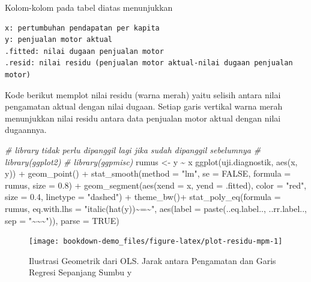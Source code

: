 \documentclass[
]{book}
\newenvironment{Shaded}{\begin{snugshade}}{\end{snugshade}}
\newcommand{\AttributeTok}[1]{\textcolor[rgb]{0.77,0.63,0.00}{#1}}
\newcommand{\CommentTok}[1]{\textcolor[rgb]{0.56,0.35,0.01}{\textit{#1}}}
\newcommand{\ConstantTok}[1]{\textcolor[rgb]{0.00,0.00,0.00}{#1}}
\newcommand{\FloatTok}[1]{\textcolor[rgb]{0.00,0.00,0.81}{#1}}
\newcommand{\FunctionTok}[1]{\textcolor[rgb]{0.00,0.00,0.00}{#1}}
\newcommand{\NormalTok}[1]{#1}
\newcommand{\OtherTok}[1]{\textcolor[rgb]{0.56,0.35,0.01}{#1}}
\newcommand{\SpecialCharTok}[1]{\textcolor[rgb]{0.00,0.00,0.00}{#1}}
\newcommand{\StringTok}[1]{\textcolor[rgb]{0.31,0.60,0.02}{#1}}
\begin{document}
Kolom-kolom pada tabel diatas menunjukkan

\begin{verbatim}
x: pertumbuhan pendapatan per kapita
y: penjualan motor aktual
.fitted: nilai dugaan penjualan motor
.resid: nilai residu (penjualan motor aktual-nilai dugaan penjualan motor)
\end{verbatim}

Kode berikut memplot nilai residu (warna merah) yaitu selisih antara nilai pengamatan aktual dengan nilai dugaan. Setiap garis vertikal warna merah menunjukkan nilai residu antara data penjualan motor aktual dengan nilai dugaannya.

\begin{Shaded}
\begin{Highlighting}[]
\CommentTok{\# library tidak perlu dipanggil lagi jika sudah dipanggil sebelumnya}
\CommentTok{\# library(ggplot2) }
\CommentTok{\# library(ggpmisc)}
\NormalTok{rumus }\OtherTok{\textless{}{-}}\NormalTok{ y }\SpecialCharTok{\textasciitilde{}}\NormalTok{ x}
\FunctionTok{ggplot}\NormalTok{(uji.diagnostik, }\FunctionTok{aes}\NormalTok{(x, y)) }\SpecialCharTok{+}
  \FunctionTok{geom\_point}\NormalTok{() }\SpecialCharTok{+}
  \FunctionTok{stat\_smooth}\NormalTok{(}\AttributeTok{method =} \StringTok{"lm"}\NormalTok{, }\AttributeTok{se =} \ConstantTok{FALSE}\NormalTok{, }\AttributeTok{formula =}\NormalTok{ rumus, }\AttributeTok{size =} \FloatTok{0.8}\NormalTok{) }\SpecialCharTok{+}
  \FunctionTok{geom\_segment}\NormalTok{(}\FunctionTok{aes}\NormalTok{(}\AttributeTok{xend =}\NormalTok{ x, }\AttributeTok{yend =}\NormalTok{ .fitted), }\AttributeTok{color =} \StringTok{"red"}\NormalTok{, }\AttributeTok{size =} \FloatTok{0.4}\NormalTok{, }\AttributeTok{linetype =} \StringTok{"dashed"}\NormalTok{) }\SpecialCharTok{+} 
  \FunctionTok{theme\_bw}\NormalTok{()}\SpecialCharTok{+}
   \FunctionTok{stat\_poly\_eq}\NormalTok{(}\AttributeTok{formula =}\NormalTok{ rumus,}
                \AttributeTok{eq.with.lhs =} \StringTok{"italic(hat(y))\textasciitilde{}\textasciigrave{}=\textasciigrave{}\textasciitilde{}"}\NormalTok{,}
                \FunctionTok{aes}\NormalTok{(}\AttributeTok{label =} \FunctionTok{paste}\NormalTok{(..eq.label.., ..rr.label.., }\AttributeTok{sep =} \StringTok{"\textasciitilde{}\textasciitilde{}\textasciitilde{}"}\NormalTok{)), }
                \AttributeTok{parse =} \ConstantTok{TRUE}\NormalTok{) }
\end{Highlighting}
\end{Shaded}

\begin{figure}[H]

{\centering \texttt{[image: bookdown-demo\_files/figure-latex/plot-residu-mpm-1]} 

}

\caption{Ilustrasi Geometrik dari OLS. Jarak antara Pengamatan dan Garis Regresi Sepanjang Sumbu y}\label{fig:plot-residu-mpm}
\end{figure}
\end{document}
